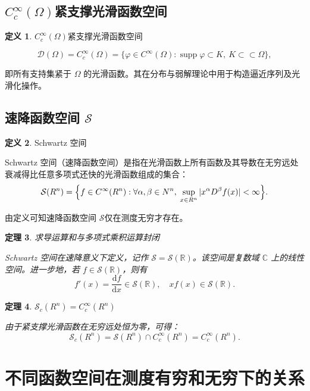 \documentclass[12pt,a4paper]{article}
\newcommand{\R}{\mathbb{R}}                %
\newcommand{\N}{\mathbb{N}}                %
\DeclareMathOperator{\supp}{supp}          %
\def\R{R}%
\def\N{N}%
\theoremstyle{plain}
\newtheorem{theorem}{定理}[section]
\theoremstyle{definition}
\newtheorem{definition}[theorem]{定义}
\theoremstyle{remark}
\begin{document}
	\subsection{\texorpdfstring{$C_c^\infty(\Omega)$}{Cc∞}紧支撑光滑函数空间}
	
	\begin{definition}$C_c^\infty(\Omega)$紧支撑光滑函数空间

		\[
		\mathcal D(\Omega)=	C_c^\infty(\Omega)
		=\{\varphi\in C^\infty(\Omega):\supp\varphi\subset K,\ K\subset\subset\Omega\},
		\]
		
		
		即所有支持集紧于 $\Omega$ 的光滑函数。其在分布与弱解理论中用于构造逼近序列及光滑化操作。
		
	\end{definition}
	
	\subsection{速降函数空间 $\mathcal S$}
	
	\begin{definition}Schwartz 空间
		
		Schwartz 空间（速降函数空间）是指在光滑函数上所有函数及其导数在无穷远处衰减得比任意多项式还快的光滑函数组成的集合：
		\[
		\mathcal S(\R^n)
		=\Bigl\{f\in C^\infty(\R^n):
		\forall\alpha,\beta\in\N^n,\;\sup_{x\in\R^n}|x^\alpha D^\beta f(x)|<\infty\Bigr\}.
		\]
	\end{definition}
	
	由定义可知速降函数空间 $\mathcal S$仅在测度无穷才存在。
	
	
	
	  \begin{theorem}求导运算和与多项式乘积运算封闭
		
			Schwartz 空间在速降意义下定义，记作 \( \mathcal{S} = \mathcal{S}(\mathbb{R}) \)。该空间是复数域 \( \mathbb{C} \) 上的线性空间。进一步地，若 \( f \in \mathcal{S}(\mathbb{R}) \)，则有
		\[
		f'(x) = \frac{\mathrm{d}f}{\mathrm{d}x} \in \mathcal{S}(\mathbb{R}), \quad xf(x) \in \mathcal{S}(\mathbb{R}).
		\]
	\end{theorem}
	
\begin{theorem}$\mathcal S_c(\R^n)=C_c^\infty(\R^n)$
	
	
	由于紧支撑光滑函数在无穷远处恒为零，可得：
	\[
	\mathcal S_c(\R^n)
	=\mathcal S(\R^n)\cap C_c^\infty(\R^n)
	=C_c^\infty(\R^n).
	\]
	\end{theorem}
	
	\section{不同函数空间在测度有穷和无穷下的关系}
	
\end{document}

